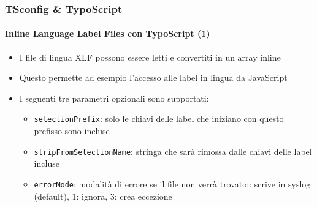 \begin{frame}[fragile]
	\frametitle{TSconfig \& TypoScript}
	\framesubtitle{Inline Language Label Files con TypoScript (1)}

	\lstset{basicstyle=\tiny\ttfamily}

	\begin{itemize}

		\item I file di lingua XLF possono essere letti e convertiti in un array inline

		\item Questo permette ad esempio l'accesso alle label in lingua da JavaScript

		\item I seguenti tre parametri opzionali sono supportati:

			\begin{itemize}
				\item \texttt{selectionPrefix}:\newline
					solo le chiavi delle label che iniziano con questo prefisso sono incluse
				\item \texttt{stripFromSelectionName}:\newline
					stringa che sarà rimossa dalle chiavi delle label incluse
				\item \texttt{errorMode}:\newline
					modalità di errore se il file non verrà trovato:: scrive in syslog (default), 1: ignora, 3: crea eccezione
			\end{itemize}

	\end{itemize}

\end{frame}


